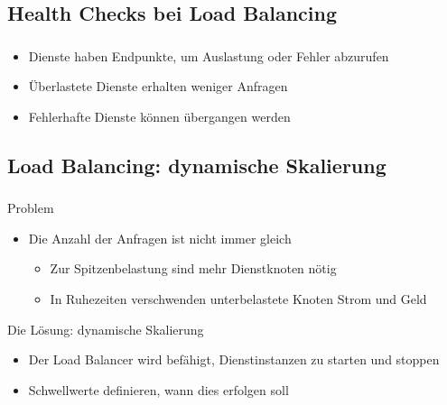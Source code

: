 \subsection{Health Checks bei Load Balancing}
\begin{frame}
    \frametitle{\insertsection}
    \framesubtitle{\insertsubsection}

    \begin{itemize}
    	\begin{block}{Konzept}
    		Dienstinstanzen kommunizieren ihren Grad der Funktionsbereitschaft, um dynamische Lastverteilung zu ermöglichen.
    	\end{block}

        \item Dienste haben Endpunkte, um Auslastung oder Fehler abzurufen
        \item Überlastete Dienste erhalten weniger Anfragen
        \item Fehlerhafte Dienste können übergangen werden
    \end{itemize}
\end{frame}

\subsection{Load Balancing: dynamische Skalierung}
\begin{frame}
    \frametitle{\insertsection}
    \framesubtitle{\insertsubsection}

    \begin{block}{Problem}
	    \begin{itemize}
	    	\item Die Anzahl der Anfragen ist nicht immer gleich
	   		\begin{itemize}
	   			\item Zur Spitzenbelastung sind mehr Dienstknoten nötig
	   			\item In Ruhezeiten verschwenden unterbelastete Knoten Strom und Geld
	   		\end{itemize}
	    \end{itemize}
    \end{block}

    \begin{block}{Die Lösung: dynamische Skalierung}
		\begin{itemize}
			\item Der Load Balancer wird befähigt, Dienstinstanzen zu starten und stoppen
			\item Schwellwerte definieren, wann dies erfolgen soll
		\end{itemize}
    \end{block}
\end{frame}

